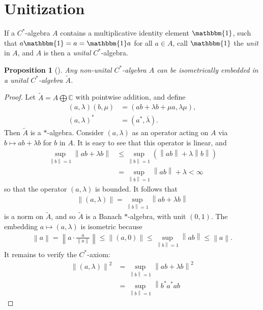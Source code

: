 \documentclass[11pt,a4paper]{report}
\theoremstyle{plain}
\newtheorem*{prop*}{Proposition}
\theoremstyle{definition}
\newcommand{\1}{\mathbbm{1}}
\newcommand{\C}{\mathbb{C}}
\renewcommand{\oplus}{\textstyle\bigoplus}
\begin{document}
\section{Unitization}
If a $C^\ast$-algebra $A$ contains a multiplicative identity element $\1$, such that 
$a \1 = a = \1  a$ for all $a \in A$, call $\1$ the \emph{unit} 
in $A$, and $A$ is then a \emph{unital} $C^\ast$-algebra.

\begin{prop*}[{\cite[I.1.3]{davidson96}}]
	Any non-unital $C^\ast$-algebra $A$ can be isometrically embedded in a unital $C^\ast$-algebra 
	$\tilde{A}$.
\end{prop*}
\begin{proof}
	Let $\tilde{A} = A \oplus \C$ with pointwise addition, and define
	\begin{align*}
		(a,\lambda) (b,\mu) &= (ab+\lambda b + \mu a, \lambda \mu),				\\
		(a,\lambda)^\ast &= (a^\ast,\overline{\lambda}).
	\end{align*}
	Then $\tilde{A}$ is a $\ast$-algebra. 
	Consider $(a,\lambda)$ as an operator acting on $A$ via $b\mapsto ab+\lambda b$ for $b$ in $A$. It 
	is easy to see that this operator is linear, and 
	\begin{align*}
				\sup_{\left\|b\right\|=1}\left\|ab+\lambda b\right\| 
		&\leq 	\sup_{\left\|b\right\|=1} (\left\|ab\right\|+ \lambda\left\|b\right\|)		\\
		&=		\sup_{\left\|b\right\|=1} \left\|ab\right\|+ \lambda < \infty
	\end{align*}
	so that the operator $(a,\lambda)$ is bounded. It follows that
	\begin{align*}
		\left\|(a,\lambda)\right\| = \sup_{\left\|b\right\|=1}\left\|ab+\lambda b\right\|
	\end{align*}
	is a norm on $\tilde{A}$, and so $\tilde{A}$ is a Banach $\ast$-algebra, with unit $(0,1)$.
	The embedding $a\mapsto(a,\lambda)$ is isometric because 
	\begin{align*}
		\left\|a\right\| = \left\|a\cdot\frac{a}{\left\|a\right\|}\right\| 
						 \leq \left\|(a,0)\right\| 
						 \leq \sup_{\left\|b\right\|=1}{\left\|ab\right\|} 
						 \leq \left\|a\right\|.
	\end{align*}
	It remains to verify the $C^\ast$-axiom:
	\begin{align*}
				\left\|(a,\lambda)\right\|^2 
		&=		\sup_{\left\|b\right\|=1}{\left\| ab+\lambda b\right \|^2}						\\
		&=		\sup_{\left\|b\right\|=1}{\left\| b^\ast a^\ast ab 
}
\end{align*}
\end{proof}
\end{document}
